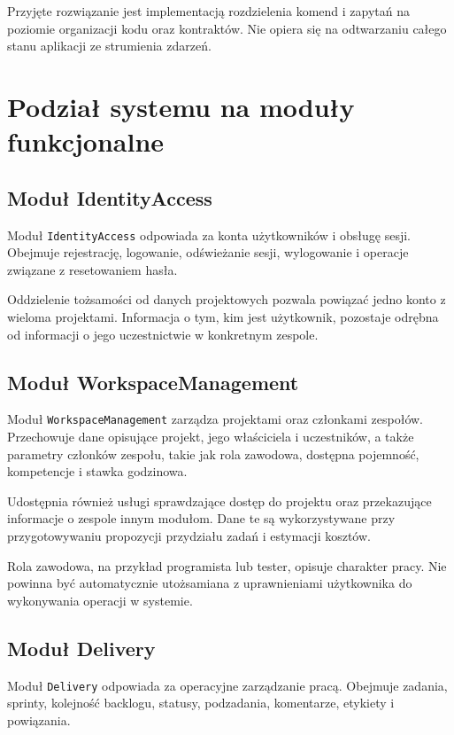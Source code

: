 Przyjęte rozwiązanie jest implementacją rozdzielenia komend i zapytań na poziomie organizacji kodu oraz kontraktów. Nie opiera się na odtwarzaniu całego stanu aplikacji ze strumienia zdarzeń.

\section{Podział systemu na moduły funkcjonalne}

\subsection{Moduł IdentityAccess}

Moduł \texttt{IdentityAccess} odpowiada za konta użytkowników i obsługę sesji. Obejmuje rejestrację, logowanie, odświeżanie sesji, wylogowanie i operacje związane z resetowaniem hasła.

Oddzielenie tożsamości od danych projektowych pozwala powiązać jedno konto z wieloma projektami. Informacja o tym, kim jest użytkownik, pozostaje odrębna od informacji o jego uczestnictwie w konkretnym zespole.

\subsection{Moduł WorkspaceManagement}

Moduł \texttt{WorkspaceManagement} zarządza projektami oraz członkami zespołów. Przechowuje dane opisujące projekt, jego właściciela i uczestników, a także parametry członków zespołu, takie jak rola zawodowa, dostępna pojemność, kompetencje i stawka godzinowa.

Udostępnia również usługi sprawdzające dostęp do projektu oraz przekazujące informacje o zespole innym modułom. Dane te są wykorzystywane przy przygotowywaniu propozycji przydziału zadań i estymacji kosztów.

Rola zawodowa, na przykład programista lub tester, opisuje charakter pracy. Nie powinna być automatycznie utożsamiana z uprawnieniami użytkownika do wykonywania operacji w systemie.

\subsection{Moduł Delivery}

Moduł \texttt{Delivery} odpowiada za operacyjne zarządzanie pracą. Obejmuje zadania, sprinty, kolejność backlogu, statusy, podzadania, komentarze, etykiety i powiązania.

